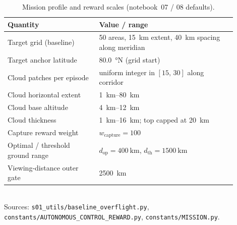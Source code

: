 \begin{table}[htbp]
  \centering
  \caption{Mission profile and reward scales (notebook~07 / 08 defaults).}
  \label{tab:constants-mission}
  \small
  \begin{tabular}{@{}p{0.36\linewidth}p{0.54\linewidth}@{}}
    \toprule
    Quantity & Value / range \\
    \midrule
    Target grid (baseline) & 50 areas, \SI{15}{\kilo\meter} extent, \SI{40}{\kilo\meter} spacing along meridian \\
    Target anchor latitude & \SI{80.0}{\degree}N (grid start) \\
    Cloud patches per episode & uniform integer in $[15,\,30]$ along corridor \\
    Cloud horizontal extent & \SIrange{1}{80}{\kilo\meter} \\
    Cloud base altitude & \SIrange{4}{12}{\kilo\meter} \\
    Cloud thickness & \SIrange{1}{16}{\kilo\meter}; top capped at \SI{20}{\kilo\meter} \\
    Capture reward weight & $w_{\mathrm{capture}} = 100$ \\
    Optimal / threshold ground range & $d_{\mathrm{op}} = \SI{400}{\kilo\meter}$, $d_{\mathrm{th}} = \SI{1500}{\kilo\meter}$ \\
    Viewing-distance outer gate & \SI{2500}{\kilo\meter} \\
    \bottomrule
  \end{tabular}
  \\[0.4em]
  {\footnotesize Sources: \texttt{s01\_utils/baseline\_overflight.py}, \texttt{constants/AUTONOMOUS\_CONTROL\_REWARD.py}, \texttt{constants/MISSION.py}.}
\end{table}
